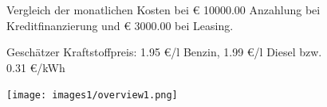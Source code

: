 \documentclass[landscape, DIV=99, 14pt]{scrartcl}
\begin{document}
\pagebreak



\pagebreak

\onecolumn
\begin{figure}
\centering
Vergleich der monatlichen Kosten bei \euro{} 10000.00 Anzahlung bei Kreditfinanzierung und \euro{} 3000.00 bei Leasing.

Gesch\"atzer Kraftstoffpreis: 1.95 \euro{}/l Benzin, 1.99 \euro{}/l Diesel bzw. 0.31 \euro{}/kWh


\vspace{1em}
\texttt{[image: images1/overview1.png]}
\end{figure}
\vfill 
\end{document}
